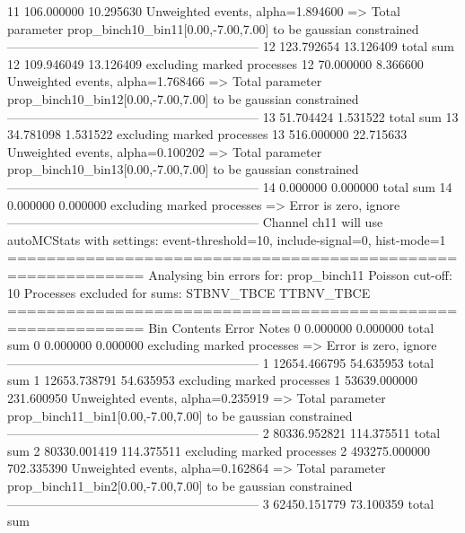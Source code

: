 11         106.000000      10.295630       Unweighted events, alpha=1.894600
  => Total parameter prop_binch10_bin11[0.00,-7.00,7.00] to be gaussian constrained
------------------------------------------------------------
12         123.792654      13.126409       total sum                     
12         109.946049      13.126409       excluding marked processes    
12         70.000000       8.366600        Unweighted events, alpha=1.768466
  => Total parameter prop_binch10_bin12[0.00,-7.00,7.00] to be gaussian constrained
------------------------------------------------------------
13         51.704424       1.531522        total sum                     
13         34.781098       1.531522        excluding marked processes    
13         516.000000      22.715633       Unweighted events, alpha=0.100202
  => Total parameter prop_binch10_bin13[0.00,-7.00,7.00] to be gaussian constrained
------------------------------------------------------------
14         0.000000        0.000000        total sum                     
14         0.000000        0.000000        excluding marked processes    
  => Error is zero, ignore      
------------------------------------------------------------
Channel ch11 will use autoMCStats with settings: event-threshold=10, include-signal=0, hist-mode=1
============================================================
Analysing bin errors for: prop_binch11
Poisson cut-off: 10
Processes excluded for sums: STBNV_TBCE TTBNV_TBCE
============================================================
Bin        Contents        Error           Notes                         
0          0.000000        0.000000        total sum                     
0          0.000000        0.000000        excluding marked processes    
  => Error is zero, ignore      
------------------------------------------------------------
1          12654.466795    54.635953       total sum                     
1          12653.738791    54.635953       excluding marked processes    
1          53639.000000    231.600950      Unweighted events, alpha=0.235919
  => Total parameter prop_binch11_bin1[0.00,-7.00,7.00] to be gaussian constrained
------------------------------------------------------------
2          80336.952821    114.375511      total sum                     
2          80330.001419    114.375511      excluding marked processes    
2          493275.000000   702.335390      Unweighted events, alpha=0.162864
  => Total parameter prop_binch11_bin2[0.00,-7.00,7.00] to be gaussian constrained
------------------------------------------------------------
3          62450.151779    73.100359       total sum                     
